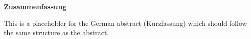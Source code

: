 \thispagestyle{empty}
\vspace*{0.2cm}

\begin{center}
    \textbf{Zusammenfassung} \label{zusammenfassung}
\end{center}

\vspace*{0.2cm}

\noindent 
This is a placeholder for the German abstract (Kurzfassung) which should follow the same structure as the abstract.